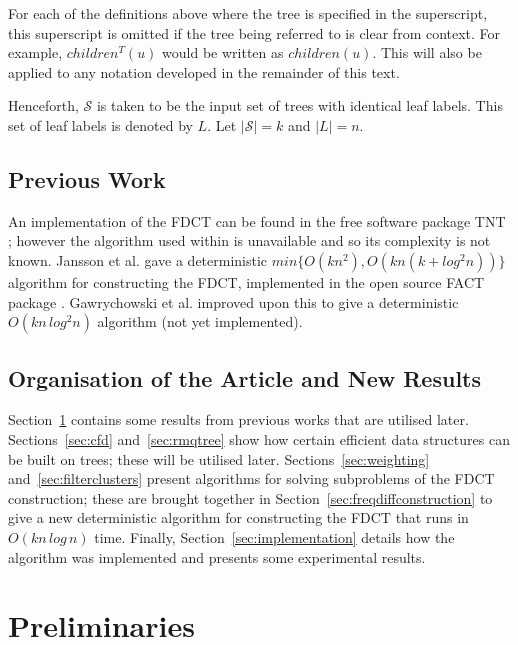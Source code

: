 \documentclass{article}
\begin{document}
    For each of the definitions above where the tree is specified in the superscript, this superscript is omitted if the tree being referred to is clear from context. For example, $children^T(u)$ would be written as $children(u)$. This will also be applied to any notation developed in the remainder of this text.

    Henceforth, $\mathcal{S}$ is taken to be the input set of trees with identical leaf labels. This set of leaf labels is denoted by $L$. Let $|\mathcal{S}| = k$ and $|L| = n$.

    \subsection{Previous Work}
    \label{subsec:previouswork}

    An implementation of the FDCT can be found in the free software package TNT \cite{goloboff2008tnt}; however the algorithm used within is unavailable and so its complexity is not known. Jansson et al. \cite{jansson2018algorithms} gave a deterministic $min\{O(kn^2), O(kn(k + log^2 n))\}$ algorithm for constructing the FDCT, implemented in the open source FACT package \cite{jansson2016improved}. Gawrychowski et al. \cite{gawrychowski2017faster} improved upon this to give a deterministic $O(kn\,log^2n)$ algorithm (not yet implemented).

    \subsection{Organisation of the Article and New Results}
    Section~\ref{sec:preliminaries} contains some results from previous works that are utilised later. Sections~\ref{sec:cfd} and~\ref{sec:rmqtree} show how certain efficient data structures can be built on trees; these will be utilised later. Sections~\ref{sec:weighting} and~\ref{sec:filterclusters} present algorithms for solving subproblems of the FDCT construction; these are brought together in Section~\ref{sec:freqdiffconstruction} to give a new deterministic algorithm for constructing the FDCT that runs in $O(kn\,log\,n)$ time. Finally, Section~\ref{sec:implementation} details how the algorithm was implemented and presents some experimental results.

    \section{Preliminaries}
    \label{sec:preliminaries}
\end{document}
